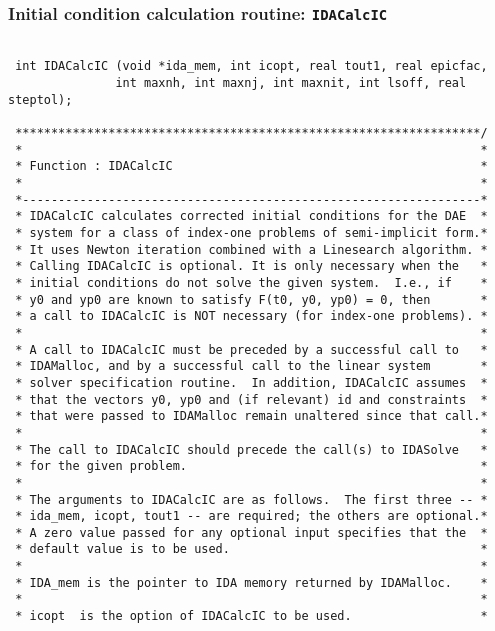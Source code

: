 \documentclass[11pt]{article}
\begin{document}
\subsubsection{Initial condition calculation routine: {\tt IDACalcIC}}

\small
\begin{verbatim}

 int IDACalcIC (void *ida_mem, int icopt, real tout1, real epicfac, 
               int maxnh, int maxnj, int maxnit, int lsoff, real steptol);

 *****************************************************************/
 *                                                                *
 * Function : IDACalcIC                                           *
 *                                                                *
 *----------------------------------------------------------------*
 * IDACalcIC calculates corrected initial conditions for the DAE  *
 * system for a class of index-one problems of semi-implicit form.*
 * It uses Newton iteration combined with a Linesearch algorithm. *
 * Calling IDACalcIC is optional. It is only necessary when the   *
 * initial conditions do not solve the given system.  I.e., if    *
 * y0 and yp0 are known to satisfy F(t0, y0, yp0) = 0, then       *
 * a call to IDACalcIC is NOT necessary (for index-one problems). *
 *                                                                *
 * A call to IDACalcIC must be preceded by a successful call to   *
 * IDAMalloc, and by a successful call to the linear system       *
 * solver specification routine.  In addition, IDACalcIC assumes  *
 * that the vectors y0, yp0 and (if relevant) id and constraints  *
 * that were passed to IDAMalloc remain unaltered since that call.*
 *                                                                *
 * The call to IDACalcIC should precede the call(s) to IDASolve   *
 * for the given problem.                                         *  
 *                                                                *
 * The arguments to IDACalcIC are as follows.  The first three -- *
 * ida_mem, icopt, tout1 -- are required; the others are optional.*
 * A zero value passed for any optional input specifies that the  *
 * default value is to be used.                                   *
 *                                                                *
 * IDA_mem is the pointer to IDA memory returned by IDAMalloc.    *
 *                                                                *
 * icopt  is the option of IDACalcIC to be used.                  *

\end{verbatim}
\end{document}

